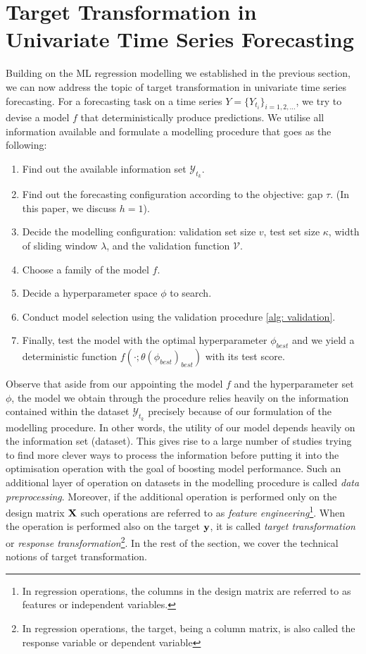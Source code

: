 \section{Target Transformation in Univariate Time Series Forecasting}

Building on the ML regression modelling we established in the previous section, we can now address the topic of target transformation in univariate time series forecasting. For a forecasting task on a time series $Y = \{ Y_{t_i} \}_{i = 1, 2, \ldots}$, we try to devise a model $f$ that deterministically produce predictions. We utilise all information available and formulate a modelling procedure that goes as the following:
\begin{enumerate}
    \item Find out the available information set $\mathcal{Y}_{t_k}$.
    \item Find out the forecasting configuration according to the objective: gap $\tau$. (In this paper, we discuss $h=1$).
    \item Decide the modelling configuration: validation set size $v$, test set size $\kappa$, width of sliding window $\lambda$, and the validation function $\mathcal{V}$.
    \item Choose a family of the model $f$.
    \item Decide a hyperparameter space $\phi$ to search.
    \item Conduct model selection using the validation procedure \ref{alg: validation}.
    \item Finally, test the model with the optimal hyperparameter $\phi_{best}$ and we yield a deterministic function $f(\cdot;\theta(\phi_{best})_{best})$ with its test score.
\end{enumerate}
Observe that aside from our appointing the model $f$ and the hyperparameter set $\phi$, the model we obtain through the procedure relies heavily on the information contained within the dataset $\mathcal{Y}_{t_k}$ precisely because of our formulation of the modelling procedure. In other words, the utility of our model depends heavily on the information set (dataset). This gives rise to a large number of studies trying to find more clever ways to process the information before putting it into the optimisation operation with the goal of boosting model performance. Such an additional layer of operation on datasets in the modelling procedure is called \textit{data preprocessing}. Moreover, if the additional operation is performed only on the design matrix $\mathbf{X}$ such operations are referred to as \textit{feature engineering}\footnote{In regression operations, the columns in the design matrix are referred to as features or independent variables.}. When the operation is performed also on the target $\mathbf{y}$, it is called \textit{target transformation} or \textit{response transformation}\footnote{In regression operations, the target, being a column matrix, is also called the response variable or dependent variable}. In the rest of the section, we cover the technical notions of target transformation.

